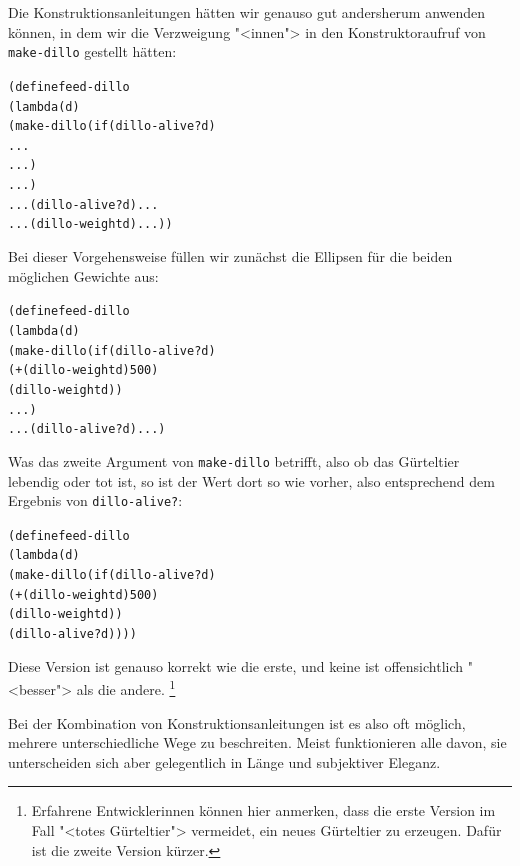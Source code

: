 Die Konstruktionsanleitungen hätten wir genauso gut andersherum
anwenden können, in dem wir die Verzweigung "<innen"> in den
Konstruktoraufruf von \texttt{make-dillo} gestellt hätten:
%
\begin{alltt}
(define feed-dillo
  (lambda (d)
    (make-dillo (if (dillo-alive? d)
                    ...
                    ...)
                ...)
   ... (dillo-alive? d) ...
   ... (dillo-weight d) ...))
\end{alltt}
%
Bei dieser Vorgehensweise füllen wir zunächst die Ellipsen für die
beiden möglichen Gewichte aus:
%
\begin{alltt}
(define feed-dillo
  (lambda (d)
    (make-dillo (if (dillo-alive? d)
                    (+ (dillo-weight d) 500)
                    (dillo-weight d))
                ...)
   ... (dillo-alive? d) ...)
\end{alltt}
%
Was das zweite Argument von \texttt{make-dillo} betrifft, also ob das
Gürteltier lebendig oder tot ist, so ist der Wert dort so wie
vorher, also entsprechend dem Ergebnis von \texttt{dillo-alive?}:
%
\begin{alltt}
(define feed-dillo
  (lambda (d)
    (make-dillo (if (dillo-alive? d)
                    (+ (dillo-weight d) 500)
                    (dillo-weight d))
                (dillo-alive? d))))
\end{alltt}
%
Diese Version ist genauso korrekt wie die erste, und keine ist
offensichtlich "<besser"> als die andere. \footnote{Erfahrene
Entwicklerinnen können hier anmerken, dass die erste Version im Fall
  "<totes Gürteltier"> vermeidet, ein neues Gürteltier zu erzeugen.
  Dafür ist die zweite Version kürzer.}

Bei der Kombination von Konstruktionsanleitungen ist es also oft
möglich, mehrere unterschiedliche Wege zu beschreiten.  Meist
funktionieren alle davon, sie unterscheiden sich aber gelegentlich in
Länge und subjektiver Eleganz.

